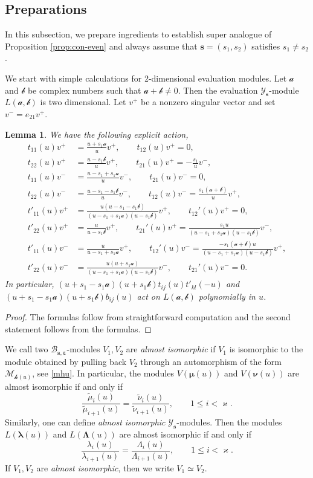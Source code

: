 \documentclass[11pt,reqno]{amsart}
\numberwithin{equation}{section}
\newtheorem{lem}[thm]{Lemma}
\theoremstyle{definition}
\theoremstyle{remark}
\newcommand{\mc}{\mathcal}
\newcommand{\tl}{\tilde}
\newcommand{\lle}{\leqslant}
\newcommand{\la}{\lambda}
\newcommand{\La}{\Lambda}
\newcommand{\YglMN}{\mathscr{Y}_{\bm s}}
\newcommand{\YMN}{{\mathscr{Y}_{\bm s}}}
\newcommand{\BMN}{{\mathscr{B}_{\bm s,\bm \ve}}}
\newcommand{\ka}{\varkappa}
\newcommand{\ve}{\varepsilon}
\begin{document}
\subsection{Preparations}
In this subsection, we prepare ingredients to establish super analogue of Proposition \ref{prop:con-even} and always assume that $\bm s=(s_1,s_2)$ satisfies $s_1\ne s_2$.

We start with simple calculations for 2-dimensional evaluation modules. Let $\mc a$ and $\mc b$ be complex numbers such that $\mc a+\mc b\ne 0$. Then the evaluation $\YglMN$-module $L(\mc a,\mc b)$ is two dimensional. Let $v^+$ be a nonzero singular vector and set $v^-=e_{21}v^+$.

\begin{lem}\label{lemn2}
We have the following explicit action,
\begin{align*}
t_{11}(u)v^+&=\frac{u+s_1\mc a}{u}v^+,\qquad  t_{12}(u)v^+=0,\\
t_{22}(u)v^+&=\frac{u-s_1\mc b}{u}v^+,\qquad t_{21}(u)v^+=-\frac{s_1}{u}v^-,\\
t_{11}(u)v^-&=\frac{u-s_1+s_1\mc a}{u}v^-,\qquad t_{21}(u)v^-=0,\\
t_{22}(u)v^-&=\frac{u-s_1-s_1\mc b}{u}v^-,\qquad t_{12}(u)v^-=\frac{s_1(\mc a+\mc b)}{u}v^+,\\
t'_{11}(u)v^+&=\frac{u(u-s_1-s_1\mc b)}{(u-s_1+s_1\mc a)(u-s_1\mc b)}v^+,\qquad  t_{12}'(u)v^+=0,\\
t'_{22}(u)v^+&=\frac{u}{u-s_1\mc b}v^+,\qquad t_{21}'(u)v^+=\frac{s_1u}{(u-s_1+s_1\mc a)(u-s_1\mc b)}v^-,\\
t'_{11}(u)v^-&=\frac{u}{u-s_1+s_1\mc a}v^+,\qquad t_{12}'(u)v^-=\frac{-s_1(\mc a+\mc b)u}{(u-s_1+s_1\mc a)(u-s_1\mc b)}v^+,\\
t'_{22}(u)v^-&=\frac{u(u+s_1\mc a)}{(u-s_1+s_1\mc a)(u-s_1\mc b)}v^-, \qquad t_{21}'(u)v^-=0.
\end{align*}
In particular, $(u+s_1-s_1\mc a)(u+s_1\mc b)t_{ij}(u)t'_{kl}(-u)$ and $(u+s_1-s_1\mc a)(u+s_1\mc b)b_{ij}(u)$ act on $L(\mc a,\mc b)$ polynomially in $u$.
\end{lem}
\begin{proof}
The formulas follow from straightforward computation and the second statement follows from the formulas.
\end{proof}

We call two $\BMN$-modules $V_1,V_2$ are \textit{almost isomorphic} if $V_1$ is isomorphic to the module obtained by pulling back $V_2$ through an automorphism of the form $\mc M_{\mc h(u)}$, see \eqref{mhu}. In particular, the modules $V(\bm\mu(u))$ and $V(\bm\nu(u))$ are almost isomorphic if and only if
\[
\frac{\tl \mu_i(u)}{\tl \mu_{i+1}(u)}=\frac{\tl \nu_i(u)}{\tl \nu_{i+1}(u)},\qquad 1\lle i<\ka.
\]
Similarly, one can define \textit{almost isomorphic} $\YMN$-modules. Then the modules $L(\bm\la(u))$ and $L(\bm\La(u))$ are almost isomorphic if and only if
\[
\frac{\la_i(u)}{\la_{i+1}(u)}=\frac{\La_i(u)}{\La_{i+1}(u)},\qquad 1\lle i<\ka.
\]
If $V_1,V_2$ are \textit{almost isomorphic}, then we write $V_1\simeq V_2$.
\end{document}
